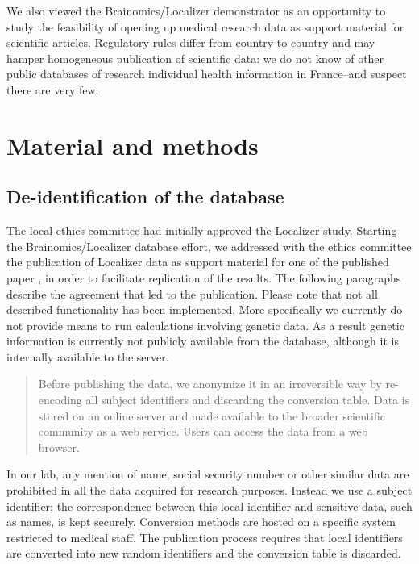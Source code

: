 \documentclass[preprint,12pt]{elsarticle}
\begin{document}
We also viewed the Brainomics/Localizer demonstrator as an opportunity to study the feasibility of opening up medical research data as support material for scientific articles. Regulatory rules differ from country to country and may hamper homogeneous publication of scientific data: we do not know of other public databases of research individual health information in France--and suspect there are very few.


\section{Material and methods}

\subsection{De-identification of the database}
\label{sec:de-identification}

The local ethics committee had initially approved the Localizer study. Starting the Brainomics/Localizer database effort, we addressed with the ethics committee the publication of Localizer data as support material for one of the published paper \cite{Pinel2012}, in order to facilitate replication of the results. The following paragraphs describe the agreement that led to the publication. Please note that not all described functionality has been implemented. More specifically we currently do not provide means to run calculations involving genetic data. As a result genetic information is currently not publicly available from the database, although it is internally available to the server.

\begin{quotation}
Before publishing the data, we anonymize it in an irreversible way by re-encoding all subject identifiers and discarding the conversion table. Data is stored on an online server and made available to the broader scientific community as a web service. Users can access the data from a web browser.
\end{quotation}
In our lab, any mention of name, social security number or other similar data are prohibited in all the data acquired for research purposes. Instead we use a subject identifier; the correspondence between this local identifier and sensitive data, such as names, is kept securely. Conversion methods are hosted on a specific system restricted to medical staff. The publication process requires that local identifiers are converted into new random identifiers and the conversion table is discarded.
\end{document}
